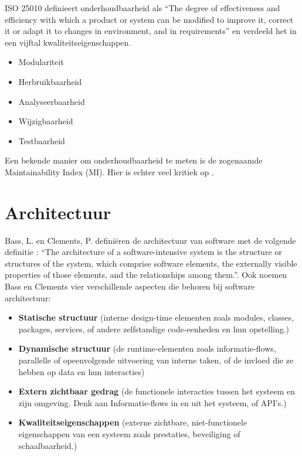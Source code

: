 ISO 25010 \parencite{ISO25010} definieert onderhoudbaarheid als \enquote{The degree of effectiveness and efficiency with which a product or system can be modified to improve it, correct it or adapt it to changes in environment, and in requirements} en verdeeld het in een vijftal kwaliteitseigenschappen.
\begin{itemize}
	\item Modulariteit
	\item Herbruikbaarheid
	\item Analyseerbaarheid
	\item Wijzigbaarheid
	\item Testbaarheid
\end{itemize}

Een bekende manier om onderhoudbaarheid te meten is de zogenaamde Maintainability Index (MI). Hier is echter veel kritiek op \parencite{MaintainabilityLiteratureReview, WhyNoMI, WhyNoMI2}.

\section{Architectuur}
Bass, L. en Clements, P. definiëren de architectuur van software met de volgende definitie \parencite{ArchitectureInPractice}: \enquote{The architecture of a software-intensive system is the structure or structures of the system, which comprise software elements, the externally visible properties of those elements, and the relationships among them.}. Ook noemen Bass en Clements vier verschillende aspecten die behoren bij software architectuur:
\begin{itemize}
	\item \textbf{Statische structuur} (interne design-time elementen zoals modules, classes, packages, services, of andere zelfstandige code-eenheden en hun opstelling.)
	\item \textbf{Dynamische structuur} (de runtime-elementen zoals informatie-flows, parallelle of opeenvolgende uitvoering van interne taken, of de invloed die ze hebben op data en hun interacties)
	\item \textbf{Extern zichtbaar gedrag} (de functionele interacties tussen het systeem en zijn omgeving. Denk aan Informatie-flows in en uit het systeem, of API's.)
	\item \textbf{Kwaliteitseigenschappen} (externe zichtbare, niet-functionele eigenschappen van een systeem zoals prestaties, beveiliging of schaalbaarheid.)
\end{itemize}

